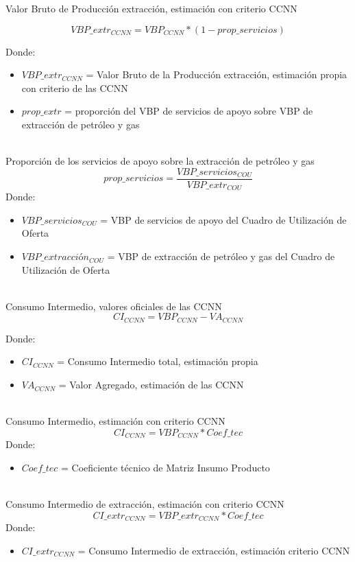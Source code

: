\documentclass[letterpaper,11pt, spanish]{scrartcl}
\begin{document}
\begin{itemize}
\begin{itemize}
\end{itemize}

Valor Bruto de Producción extracción, estimación con criterio CCNN

$$VBP\_extr_{CCNN} = VBP_{CCNN} * (1-prop\_servicios)$$

Donde:
\begin{itemize}
\item $VBP\_extr_{CCNN}$ = Valor Bruto de la Producción extracción,  estimación propia con criterio de las CCNN
\item $prop\_extr$ = proporción del VBP de servicios de apoyo sobre VBP de extracción de petróleo y gas\\ \\
\end{itemize}


Proporción de los servicios de apoyo sobre la extracción de petróleo y gas
$$prop\_servicios = \frac{VBP\_servicios_{COU}}{VBP\_extr_{COU}}$$
Donde:
\begin{itemize}
\item $VBP\_servicios_{COU}$ = VBP de servicios de apoyo del Cuadro de Utilización de Oferta
\item $VBP\_extracción_{COU}$ = VBP de extracción de petróleo y gas del Cuadro de Utilización de Oferta\\ \\
\end{itemize}


Consumo Intermedio, valores oficiales de las CCNN
$$ CI_{CCNN} = VBP_{CCNN} -  VA_{CCNN} $$

Donde:
\begin{itemize}
\item $CI_{CCNN}$ = Consumo Intermedio total, estimación propia
\item $VA_{CCNN}$ = Valor Agregado, estimación de las CCNN \\ \\
\end{itemize}


Consumo Intermedio, estimación con criterio CCNN
$$ CI_{CCNN} = VBP_{CCNN} *  Coef\_tec $$
Donde:
\begin{itemize}
\item $Coef\_tec$ = Coeficiente técnico de Matriz Insumo Producto\\ \\
\end{itemize}


Consumo Intermedio de extracción, estimación con criterio CCNN
$$ CI\_extr_{CCNN} = VBP\_extr_{CCNN} *  Coef\_tec $$
Donde:
\begin{itemize}
\item $ CI\_extr_{CCNN}$ = Consumo Intermedio de extracción, estimación criterio CCNN\\ \\
\end{itemize}



\end{itemize}
\end{document}
